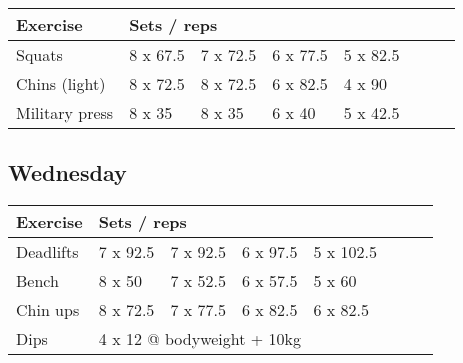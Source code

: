 \documentclass[12pt, a4paper]{article}%
\begin{document}
  \begin{tabular}{l|lllllll}
  \hspace{0.75em} \textbf{Exercise} & \multicolumn{ 7 }{l}{ \textbf{Sets / reps} } \\ \hline

            \hspace{0.75em} Squats
            & 8 x 67.5
            & 7 x 72.5
            & 6 x 77.5
            & 5 x 82.5
            & 
            & 
            & 
            \\


            \hspace{0.75em} Chins (light)
            & 8 x 72.5
            & 8 x 72.5
            & 6 x 82.5
            & 4 x 90
            & 
            & 
            & 
            \\


            \hspace{0.75em} Military press
            & 8 x 35
            & 8 x 35
            & 6 x 40
            & 5 x 42.5
            & 
            & 
            & 
            \\


  \end{tabular}

  \subsection*{\hspace{0.5em} Wednesday }


  \begin{tabular}{l|lllllll}
  \hspace{0.75em} \textbf{Exercise} & \multicolumn{ 7 }{l}{ \textbf{Sets / reps} } \\ \hline

            \hspace{0.75em} Deadlifts
            & 7 x 92.5
            & 7 x 92.5
            & 6 x 97.5
            & 5 x 102.5
            & 
            & 
            & 
            \\


            \hspace{0.75em} Bench
            & 8 x 50
            & 7 x 52.5
            & 6 x 57.5
            & 5 x 60
            & 
            & 
            & 
            \\


            \hspace{0.75em} Chin ups
            & 8 x 72.5
            & 7 x 77.5
            & 6 x 82.5
            & 6 x 82.5
            & 
            & 
            & 
            \\


   \hspace{0.75em} Dips &  \multicolumn{ 7 }{l}{ 4 x 12 @ bodyweight + 10kg } \\
  \end{tabular}
\end{document}
